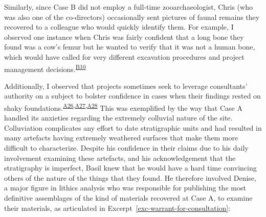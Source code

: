 \documentclass[
  canadian,
]{article}
\begin{document}
Similarly, since Case B did not employ a full-time zooarchaeologist,
Chris (who was also one of the co-directors) occasionally sent pictures
of faunal remains they recovered to a colleague who would quickly
identify them. For example, I observed one instance when Chris was
fairly confident that a long bone they found was a cow's femur but he
wanted to verify that it was not a human bone, which would have called
for very different excavation procedures and project management
decisions.\textsuperscript{\hyperref[sec-B10]{B10}}

Additionally, I observed that projects sometimes seek to leverage
consultants' authority on a subject to bolster confidence in cases when
their findings rested on shaky
foundations.\textsuperscript{\hyperref[sec-A26]{A26},\hyperref[sec-A27]{A27},\hyperref[sec-A28]{A28}}
This was exemplified by the way that Case A handled its anxieties
regarding the extremely colluvial nature of the site. Colluviation
complicates any effort to date stratigraphic units and had resulted in
many artefacts having extremely weathered surfaces that make them more
difficult to characterize. Despite his confidence in their claims due to
his daily involvement examining these artefacts, and his acknowledgement
that the stratigraphy is imperfect, Basil knew that he would have a hard
time convincing others of the nature of the things that they found. He
therefore involved Denise, a major figure in lithics analysis who was
responsible for publishing the most definitive assemblages of the kind
of materials recovered at Case A, to examine their materials, as
articulated in Excerpt~\ref{exc-warrant-for-consultation}:
\end{document}
